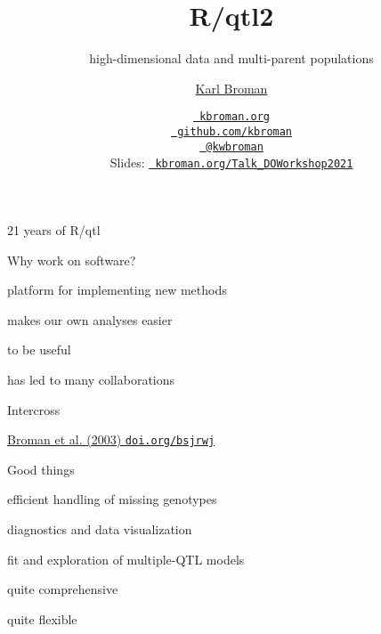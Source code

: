 \documentclass[12pt,t,aspectratio=169]{beamer}
\title{R/qtl2}
\subtitle{high-dimensional data and multi-parent populations}
\author{\href{https://kbroman.org}{Karl Broman}}
\institute{Biostatistics \& Medical Informatics, UW{\textendash}Madison}
\date{\href{https://kbroman.org}{\tt \scriptsize \color{foreground} kbroman.org}
\\[-4pt]
\href{https://github.com/kbroman}{\tt \scriptsize \color{foreground} github.com/kbroman}
\\[-4pt]
\href{https://twitter.com/kwbroman}{\tt \scriptsize \color{foreground} @kwbroman}
\\[2pt]
\scriptsize {\lolit Slides:} \href{https://kbroman.org/Talk_DOWorkshop2021}{\tt \scriptsize
  \color{foreground} kbroman.org/Talk\_DOWorkshop2021}
}
\begin{document}
{
 }



\begin{frame}[c]{21 years of R/qtl}


\end{frame}



\begin{frame}{Why work on software?}

  \bbi
\item platform for implementing new methods
\item makes our own analyses easier
\item to be useful
\item has led to many collaborations
  \ei

\end{frame}






\begin{frame}[c]{Intercross}
\end{frame}



\begin{frame}[c]{}



\hfill
\href{https://doi.org/10.1093/bioinformatics/btg112}{\scriptsize
  \lolit Broman et al. (2003) {\tt doi.org/bsjrwj}}

\end{frame}






\begin{frame}{Good things}

\bbi
  \item efficient handling of missing genotypes
  \item diagnostics and data visualization
  \item fit and exploration of multiple-QTL models
  \item quite comprehensive
  \item quite flexible
\ei

\end{frame}
\end{document}
